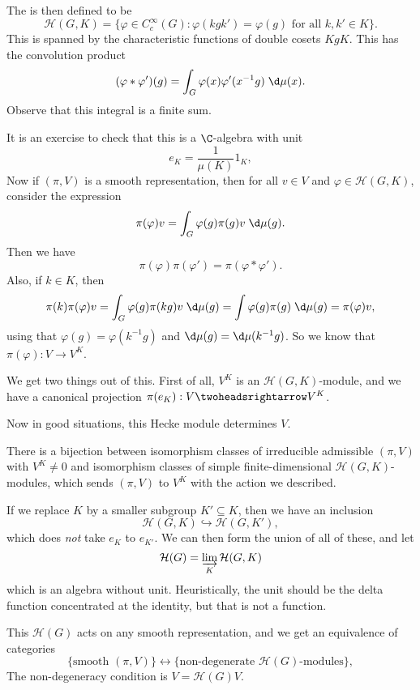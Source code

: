 \documentclass[a4paper]{article}
\begin{document}
The  is then defined to be
\[
  \mathcal{H}(G, K) = \{\varphi \in C_c^\infty(G) : \varphi(kgk') = \varphi(g)\text{ for all }k, k' \in K\}.
\]
This is spanned by the characteristic functions of double cosets $KgK$. This has the convolution product
\[
  (\varphi * \varphi')(g) = \int_G \varphi(x) \varphi'(x^{-1}g)\;\d \mu(x).
\]
Observe that this integral is a finite sum. 

It is an exercise to check that this is a $\C$-algebra with unit
\[
  e_K = \frac{1}{\mu(K)} 1_K,
\]
Now if $(\pi, V)$ is a smooth representation, then for all $v \in V$ and $\varphi \in \mathcal{H}(G, K)$, consider the expression
\[
  \pi(\varphi)v = \int_G \varphi(g) \pi(g) v\;\d \mu(g).
\]
Then we have
\[
  \pi(\varphi) \pi(\varphi') = \pi(\varphi * \varphi').
\]
Also, if $k \in K$, then
\[
  \pi(k) \pi(\varphi)v= \int_G \varphi(g) \pi(kg) v\;\d \mu(g) = \int \varphi(g) \pi(g)\;\d \mu(g) = \pi(\varphi) v,
\]
using that $\varphi(g) = \varphi(k^{-1}g)$ and $\d \mu(g) = \d \mu(k^{-1}g)$. So we know that $\pi(\varphi): V \to V^K$.

We get two things out of this. First of all, $V^K$ is an $\mathcal{H}(G, K)$-module, and we have a canonical projection $\pi(e_K): V \twoheadsrightarrow V^K$.

Now in good situations, this Hecke module determines $V$. 
\begin{prop}
  There is a bijection between isomorphism classes of irreducible admissible $(\pi, V)$ with $V^K \not= 0$ and isomorphism classes of simple finite-dimensional $\mathcal{H}(G, K)$-modules, which sends $(\pi, V)$ to $V^K$ with the action we described.
\end{prop}

If we replace $K$ by a smaller subgroup $K' \subseteq K$, then we have an inclusion
\[
  \mathcal{H}(G, K) \hookrightarrow \mathcal{H}(G, K'),
\]
which does \emph{not} take $e_K$ to $e_{K'}$. We can then form the union of all of these, and let
\[
  \mathcal{H}(G) = \varinjlim_K \mathcal{H}(G, K)
\]
which is an algebra without unit. Heuristically, the unit should be the delta function concentrated at the identity, but that is not a function.

This $\mathcal{H}(G)$ acts on any smooth representation, and we get an equivalence of categories
\[
  \{\text{smooth $(\pi, V)$}\} \leftrightarrow \{\text{non-degenerate $\mathcal{H}(G)$-modules}\},
\]
The non-degeneracy condition is $V = \mathcal{H}(G) V$.
\end{document}
